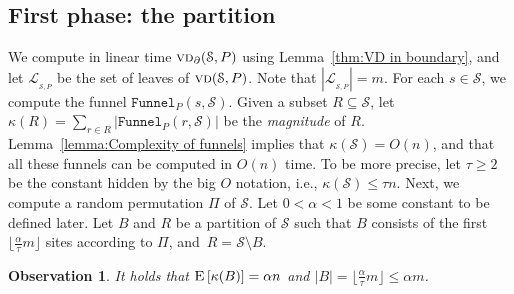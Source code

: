 \documentclass[a4paper,UKenglish]{socg-lipics-v2018}
\newtheorem{observation}[theorem]{Observation}
\newcommand{\s}{\mathcal S}
\newcommand{\funnel}[2][P]{\ensuremath{\mathtt{Funnel}_{\scriptscriptstyle #1}(#2)}}
\newcommand{\vd}[2][P]{\textsc{vd}(#2, #1)}
\newcommand{\cost}[1]{\kappa(#1)}
\newcommand{\bvd}[2][P]{\textsc{vd}_{\partial}(#2, #1)}
\newcommand{\ex}[1]{\textsc{E}\left[#1\right]}
\newcommand{\LL}[1][\s, P]{\ensuremath{\mathcal L_{_{#1}}}}
\begin{document}
\subsection{First phase: the partition}\label{section:First phase}
We compute in linear time $\bvd{\s}$ using Lemma~\ref{thm:VD in boundary}, and let $\LL$ be the set of leaves of $\vd{\s}$. Note that $|\LL| = m$. 
For each $s\in \s$, we compute the funnel $\funnel{s, \s}$. 
Given a subset $R\subseteq \s$, let $\cost{R} = \sum_{r\in R} |\funnel{r, \s}|$ be the \emph{magnitude} of $R$. 
Lemma~\ref{lemma:Complexity of funnels} implies that $\cost{\s} = O(n)$, and that all these funnels can be computed in $O(n)$ time. 
To be more precise, let $\tau\geq 2$ be the constant hidden by the big $O$ notation, i.e., $\cost{\s} \leq \tau n$. 
Next, we compute a random permutation $\Pi$ of $\s$. 
Let $0 < \alpha < 1$ be some constant to be defined later. 
Let $B$ and $R$ be a partition of $\s$ such that $B$ consists of the first $\lfloor \frac{\alpha}{\tau} m\rfloor$ sites according to $\Pi$, and~$R = \s\setminus B$. 

\begin{observation}\label{obs: Complexity of B and R}
It holds that $\ex{\cost{B}} = \alpha n$ and $|B|= \lfloor \frac{\alpha}{\tau} m\rfloor \leq \alpha m$. 
\end{observation}

\end{document}
